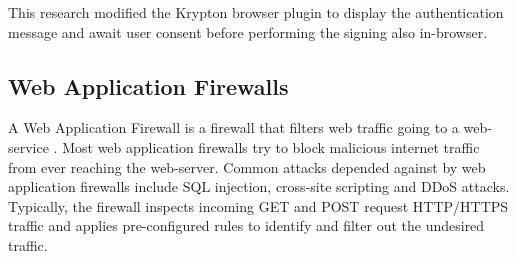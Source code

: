 This research modified the Krypton browser plugin to display the authentication message and await user consent before performing the signing also in-browser.


\subsection{Web Application Firewalls}

A Web Application Firewall is a firewall that filters web traffic going to a web-service \cite{https://cybersecurity.att.com/blogs/security-essentials/explain-how-a-web-application-firewall-works}. Most web application firewalls try to block malicious internet traffic from ever reaching the web-server. Common attacks depended against by web application firewalls include SQL injection, cross-site scripting and DDoS attacks. Typically, the firewall inspects incoming GET and POST request HTTP/HTTPS traffic and applies pre-configured rules to identify and filter out the undesired traffic.






